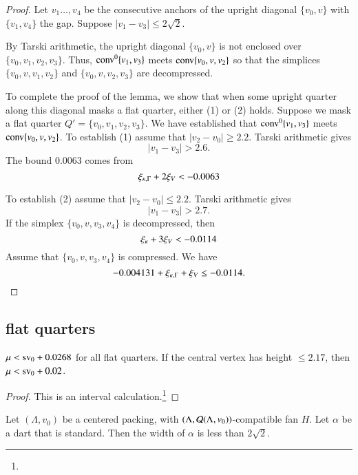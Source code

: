 \begin{proof}
\smallskip
Let $v_1\ldots,v_4$ be the consecutive anchors of
the upright diagonal $\{v_0,v\}$ with $\{v_1,v_4\}$ the gap.
Suppose $|v_1-v_3|\le 2\sqrt{2}$.

By Tarski arithmetic, 
the upright diagonal $\{v_0,v\}$ is not enclosed over
$\{v_0,v_1,v_2,v_3\}$.   
Thus, ${\operatorname{conv}}^0\{v_1,v_3\}$ meets ${\operatorname{conv}}\{v_0,v,v_2\}$ so that the
simplices $\{v_0,v,v_1,v_2\}$
and $\{v_0,v,v_2,v_3\}$ are decompressed.

To complete the proof of the lemma, we show that when
some upright quarter along this diagonal masks a flat quarter, 
 either (1) or (2) holds.
Suppose we mask a flat quarter $Q'=\{v_0,v_1,v_2,v_3\}$.
We have established that ${\operatorname{conv}}^0\{v_1,v_3\}$ meets 
${\operatorname{conv}}\{v_0,v,v_2\}$.
To establish (1) assume that $|v_2-v_0|\ge 2.2$.  Tarski arithmetic 
gives
    $$|v_1-v_3|>2.6.$$
The bound $0.0063$ comes from
    $$\xi_{\kappa,\Gamma} + 2\xi_V < -0.0063$$

To establish (2) assume that $|v_2-v_0|\le 2.2$. Tarski arithmetic gives
    $$|v_1-v_3|>2.7.$$
  If the simplex
$\{v_0,v,v_3,v_4\}$ is decompressed, then $$\xi_\kappa + 3\xi_V  < -0.0114$$
Assume that $\{v_0,v,v_3,v_4\}$ is compressed. We have
    $$-0.004131 +\xi_{\kappa,\Gamma} + \xi_V \le -0.0114.$$
\end{proof}

\subsection{flat quarters} %



\begin{lemma}
$\mu < {\operatorname{sv}}_0 +0.0268$ for all flat quarters. If the central
vertex has height $\le2.17$, then $\mu<{\operatorname{sv}}_0+0.02$.
\end{lemma}

\begin{proof}
This is an interval calculation.\footnote{} %
\end{proof}




\begin{lemma}\label{lemma:1.32}
Let $(\Lambda,v_0)$ be a centered packing, 
with $(\Lambda,{\mathcal Q}(\Lambda,v_0))$-compatible fan $H$.
Let $\alpha$ be a dart that
is standard.
Then the width of $\alpha$ is less than $2\sqrt2$.
\end{lemma}


